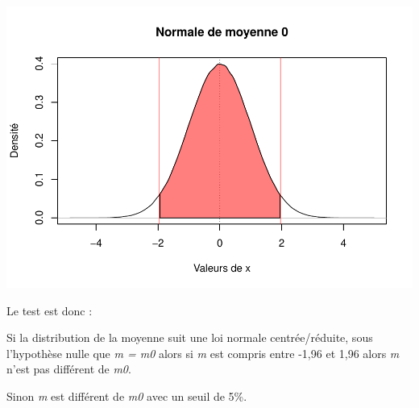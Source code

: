 \documentclass[
]{book}
\begin{document}
\includegraphics{_main_files/figure-latex/graphic1-1.pdf}

Le test est donc :

Si la distribution de la moyenne suit une loi normale centrée/réduite, sous
l'hypothèse nulle que \emph{m = m0} alors si \emph{m} est compris entre -1,96 et 1,96 alors
\emph{m} n'est pas différent de \emph{m0}.

Sinon \emph{m} est différent de \emph{m0} avec un seuil de 5\%.
\end{document}
